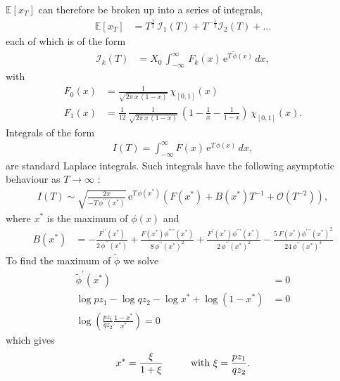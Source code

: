 \documentclass[11pt]{article}
\begin{document}
$\mathbb{E}\left[x_T \right] $ can therefore be broken up into a series of integrals,
\begin{align}
\label{eq-Ex-mult2}
\mathbb{E}\left[x_T \right] &= T^\frac{1}{2}\, \mathcal{I}_1(T) + T^{-\frac{1}{2}} \mathcal{I}_2(T) +\ldots 
\end{align}
each of which is of the form
\begin{align}
\label{eq-Fk-mult}
 \mathcal{I}_k(T) & =  X_0\, \int_{-\infty}^\infty\, F_k(x) \,\mathrm{e}^{T\,\widetilde{\phi}(x)}\, d x,
\end{align}
with
\begin{align}
\label{eq-ampl0} F_0(x) &=  \frac{1}{\sqrt{2 \pi \,x\,(1-x)}} \, \chi_{\left[0, 1\right]}(x)\\
\label{eq-ampl1} F_1(x) &=  \frac{1}{12}\, \frac{1}{\sqrt{2 \pi \,x\,(1-x)}} \, \left( 1-\frac{1}{x} - \frac{1}{1-x}\right)\,\chi_{\left[0, 1\right]}(x).
\end{align}
Integrals of the form
\begin{align}
\label{eq-LaplaceIntegral0}
I(T) = \int_{-\infty}^{\infty} F(x)\,\mathrm{e}^{T\,\phi(x)}\, dx,
\end{align}
are standard Laplace integrals. Such integrals have the following asymptotic behaviour as $T \to \infty$ \cite{bender2013advanced}:
\begin{align}
\label{eq-LaplaceAsymptoticFormula}
I(T) \sim \sqrt{\frac{2\pi }{-T\,\phi^{\prime\prime}(x^*)}}\,\mathrm{e}^{T \,\phi(x^*)}\left(F(x^*)+B(x^*) T^{-1}+\mathcal{O}\left(T^{-2}\right)\right),
\end{align}
where $x^*$ is the maximum of $\phi(x)$ and
\begin{align}
B(x^*) &=  - \frac{F^{\prime\prime}(x^*)}{2\, \phi^{\prime\prime}(x^*)} 
                 + \frac{F(x^*) \phi^{\prime\prime\prime\prime}(x^*)}{8\,\phi^{\prime\prime}(x^*)^2}
                 + \frac{F^\prime(x^*) \phi^{\prime\prime\prime}(x^*)}{2\,\phi^{\prime\prime}(x^*)^2}
                 - \frac{5\,F(x^*) \phi^{\prime\prime\prime}(x^*)^2}{24\,\phi^{\prime\prime}(x^*)^3}
\end{align}
To find the maximum of $\widetilde{\phi}$ we solve
\begin{align*}
\widetilde{\phi}^\prime (x^*) &= 0\\
 \log p z_1 - \log q z_2 - \log x^* + \log (1-x^*) &= 0\\
 \log \left( \frac{p z_1}{q z_2} \frac{1-x^*}{x^*}\right) = 0
\end{align*}
which gives
\begin{align}
\label{eq-xStar-mult}
x^* = \frac{\xi}{1+\xi} \hspace{1.0cm}\text{with }\xi = \frac{p z_1}{q z_2}.
\end{align}
\end{document}
